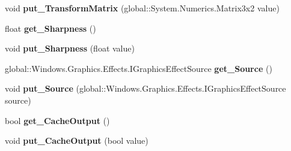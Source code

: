 \begin{DoxyCompactItemize}
\item 
\mbox{\label{class_microsoft_1_1_graphics_1_1_canvas_1_1_effects_1_1_transform2_d_effect_ab2dc992da27919ab922f3015532abe68}} 
void {\bfseries put\+\_\+\+Transform\+Matrix} (global\+::\+System.\+Numerics.\+Matrix3x2 value)
\item 
\mbox{\label{class_microsoft_1_1_graphics_1_1_canvas_1_1_effects_1_1_transform2_d_effect_aa820a4ea7ef6fe6bb2d75e16c55e2d44}} 
float {\bfseries get\+\_\+\+Sharpness} ()
\item 
\mbox{\label{class_microsoft_1_1_graphics_1_1_canvas_1_1_effects_1_1_transform2_d_effect_af157b24374215992f857b4060fe2ed79}} 
void {\bfseries put\+\_\+\+Sharpness} (float value)
\item 
\mbox{\label{class_microsoft_1_1_graphics_1_1_canvas_1_1_effects_1_1_transform2_d_effect_af35c6e93668e25c4c57cbcbce7286516}} 
global\+::\+Windows.\+Graphics.\+Effects.\+I\+Graphics\+Effect\+Source {\bfseries get\+\_\+\+Source} ()
\item 
\mbox{\label{class_microsoft_1_1_graphics_1_1_canvas_1_1_effects_1_1_transform2_d_effect_a89344f36eb3d3c2b19dbe91b8d618d90}} 
void {\bfseries put\+\_\+\+Source} (global\+::\+Windows.\+Graphics.\+Effects.\+I\+Graphics\+Effect\+Source source)
\item 
\mbox{\label{class_microsoft_1_1_graphics_1_1_canvas_1_1_effects_1_1_transform2_d_effect_a0fa10cae13f8320eff8aec6d07d06087}} 
bool {\bfseries get\+\_\+\+Cache\+Output} ()
\item 
\mbox{\label{class_microsoft_1_1_graphics_1_1_canvas_1_1_effects_1_1_transform2_d_effect_a83fe51eac7119fbca7ce7c753822cb8f}} 
void {\bfseries put\+\_\+\+Cache\+Output} (bool value)
\item 

\end{DoxyCompactItemize}
